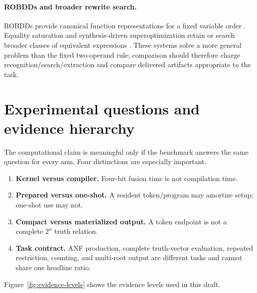 \documentclass[10pt]{article}
\theoremstyle{plain}
\theoremstyle{definition}
\theoremstyle{remark}
\begin{document}
\paragraph{ROBDDs and broader rewrite search.}
ROBDDs provide canonical function representations for a fixed variable order \cite{Bryant1986}. Equality saturation and synthesis-driven superoptimization retain or search broader classes of equivalent expressions \cite{Willsey2021,Sasnauskas2017}. These systems solve a more general problem than the fixed two-operand rule; comparison should therefore charge recognition/search/extraction and compare delivered artifacts appropriate to the task.

\section{Experimental questions and evidence hierarchy}
\label{sec:evaluation}

The computational claim is meaningful only if the benchmark answers the same question for every arm. Four distinctions are especially important.

\begin{enumerate}
 \item \textbf{Kernel versus compiler.} Four-bit fusion time is not compilation time.
 \item \textbf{Prepared versus one-shot.} A resident token/program may amortize setup; one-shot use may not.
 \item \textbf{Compact versus materialized output.} A token endpoint is not a complete $2^n$ truth relation.
 \item \textbf{Task contract.} ANF production, complete truth-vector evaluation, repeated restriction, counting, and multi-root output are different tasks and cannot share one headline ratio.
\end{enumerate}

Figure~\ref{fig:evidence-levels} shows the evidence levels used in this draft.
\end{document}
